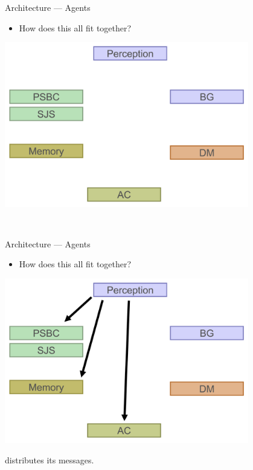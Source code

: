    \begin{frame}{Architecture --- Agents}
      \begin{itemize}
         \item {How does this all fit together?}
      \end{itemize}
      
      \begin{center}
         \includegraphics[width=0.8\textwidth]{plan_0.png}
      \end{center}
      
      ~
   \end{frame}
   
   \begin{frame}{Architecture --- Agents}
      \begin{itemize}
         \item {How does this all fit together?}
      \end{itemize}
      
      \begin{center}
         \includegraphics[width=0.8\textwidth]{plan_1.png}
      \end{center}
      
       distributes its messages.
   \end{frame}
   
